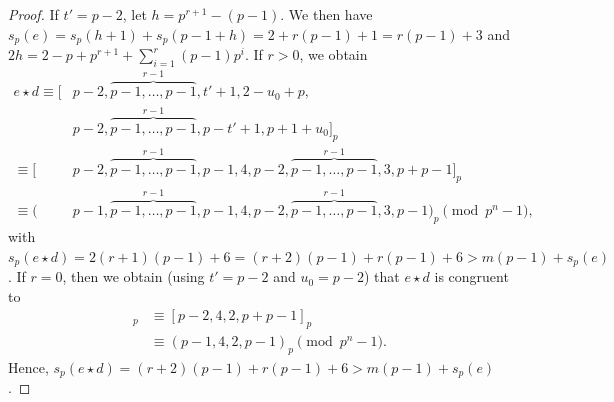 \documentclass[10pt,a4paper]{amsart}
\newcommand{\wt}{s_p}
\begin{document}
\begin{proof}
If $t' = p-2$, let $h = p^{r + 1} - (p - 1)$. We then have $\wt(e) = \wt(h+1) + \wt(p-1+h) = 2 + r(p-1) + 1 = r(p-1) + 3$ and $2h = 2 - p + p^{r+1} + \sum_{i=1}^r(p-1)p^i$. If $r>0$, we obtain
\begin{align*}
    e \star d \equiv [&p-2,\overbrace{p-1,\dots,p-1}^{r-1},t'+1, 2-u_0+p,\\
    &p-2,\overbrace{p-1,\dots,p-1}^{r-1},p-t'+1, p+1+u_0]_p \\
    \equiv [&p-2,\overbrace{p-1,\dots,p-1}^{r-1},p-1, 4,p-2,\overbrace{p-1,\dots,p-1}^{r-1},3, p+p-1]_p \\
    \equiv (&p-1,\overbrace{p-1,\dots,p-1}^{r-1},p-1, 4,p-2,\overbrace{p-1,\dots,p-1}^{r-1},3,p-1)_p \pmod {p^n-1},
\end{align*}
with $\wt(e \star d) = 2(r+1)(p-1)+6 = (r+2)(p-1) + r(p-1)+6 > m(p - 1) + \wt(e)$. If $r = 0$, then we obtain (using $t' = p - 2$ and $u_0 = p - 2$) that $e \star d$ is congruent to
\begin{align*}
    [t', 2-u_0+p,p-t', p+1+u_0]_p &\equiv [p-2, 4,2, p+p-1]_p \\
    &\equiv (p-1, 4,2, p-1)_p \pmod {p^n-1}.
\end{align*}
Hence, $\wt(e \star d) = (r+2)(p-1) + r(p-1) + 6 > m(p - 1) + \wt(e)$.


\end{proof}
\end{document}
